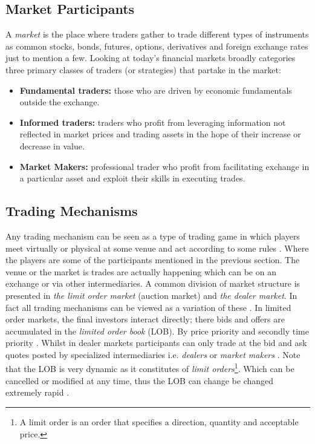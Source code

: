 \documentclass{kththesis}
\theoremstyle{definition}
\begin{document}

\subsection{Market Participants}
A \textit{market} is the place where traders gather to trade \parencite{harris2003trading} different types of instruments as common stocks, bonds, futures, options, derivatives and foreign exchange rates just to mention a few.
Looking at today's financial markets
\textcite{cartea2015algorithmic} broadly categories three primary classes of traders (or strategies) that partake in the market:
\begin{itemize}
    \item \textbf{Fundamental traders:} those who are driven by economic fundamentals outside the exchange.
    \item \textbf{Informed traders:} traders who profit from leveraging information not reflected in market prices and trading assets in the hope of their increase or decrease in value.
    \item \textbf{Market Makers:} professional trader who profit from facilitating exchange in a particular asset and exploit their skills in executing trades.
\end{itemize}

\subsection{Trading Mechanisms}
Any trading mechanism can be seen as a type of trading game in which players meet virtually or physical at some venue and act according to some rules \parencite{o1995market}. Where the players are some of the participants mentioned in the previous section. The venue or the market is trades are actually happening which can be on an exchange or via other intermediaries. A common division of market structure is presented in \textcite{foucault2013market} \textit{the limit order market} (auction market) and \textit{the dealer market}. In fact all trading mechanisms can be viewed as a variation of these \parencite{foucault2013market}.
\newline
\newline
In limited order markets, the final investors interact directly; there bids and offers are accumulated in the \textit{limited order book} (LOB). By price priority and secondly time priority \parencite{hasbrouck2007empirical}. Whilst in dealer markets participants can only trade at the bid and ask quotes posted by specialized intermediaries i.e. \textit{dealers} or \textit{market makers} \parencite{foucault2013market}. Note that the LOB is very dynamic as it constitutes of \textit{limit orders}\footnote{A limit order is an order that specifies a direction, quantity and acceptable price.}. Which can be cancelled or modified at any time, thus the LOB can change be changed extremely rapid \parencite{hasbrouck2007empirical}. 
\end{document}
